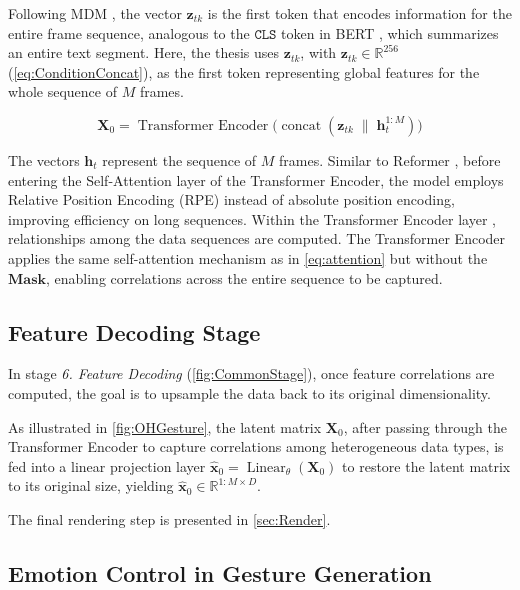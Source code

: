 Following MDM \cite{tevet2022human}, the vector $\mathbf{z}_{tk}$ is the first token that encodes information for the entire frame sequence, analogous to the $\texttt{CLS}$ token in BERT \cite{devlin2019bertpretrainingdeepbidirectional}, which summarizes an entire text segment.
Here, the thesis uses $\mathbf{z}_{tk}$, with $\mathbf{z}_{tk} \in \mathbb{R}^{256}$ (\autoref{eq:ConditionConcat}), as the first token representing global features for the whole sequence of $M$ frames.

\begin{equation}
	\mathbf{X}_{0} = \operatorname{Transformer\ Encoder}\bigl(\operatorname{concat}(\mathbf{z}_{tk} \;\|\; \mathbf{h}^{1:M}_{t})\bigr)
	\label{eq:TransformerEncoder}
\end{equation}

The vectors $\mathbf{h}_t$ represent the sequence of $M$ frames. Similar to Reformer \cite{kitaev2020reformer}, before entering the Self-Attention layer of the Transformer Encoder, the model employs Relative Position Encoding (RPE) instead of absolute position encoding, improving efficiency on long sequences.
Within the Transformer Encoder layer \cite{vaswani2017attention}, relationships among the data sequences are computed.
The Transformer Encoder applies the same self-attention mechanism as in \autoref{eq:attention} but without the $\mathbf{Mask}$, enabling correlations across the entire sequence to be captured.

\subsection{Feature Decoding Stage}

In stage \textit{6. Feature Decoding} (\autoref{fig:CommonStage}), once feature correlations are computed, the goal is to upsample the data back to its original dimensionality.

As illustrated in \autoref{fig:OHGesture}, the latent matrix $\mathbf{X}_{0}$, after passing through the Transformer Encoder to capture correlations among heterogeneous data types, is fed into a linear projection layer
$\hat{\mathbf{x}}_{0} = \operatorname{Linear}_{\theta}(\mathbf{X}_{0})$
to restore the latent matrix to its original size, yielding $\hat{\mathbf{x}}_{0} \in \mathbb{R}^{1:M \times D}$.

The final rendering step is presented in \autoref{sec:Render}.

\subsection{Emotion Control in Gesture Generation}

